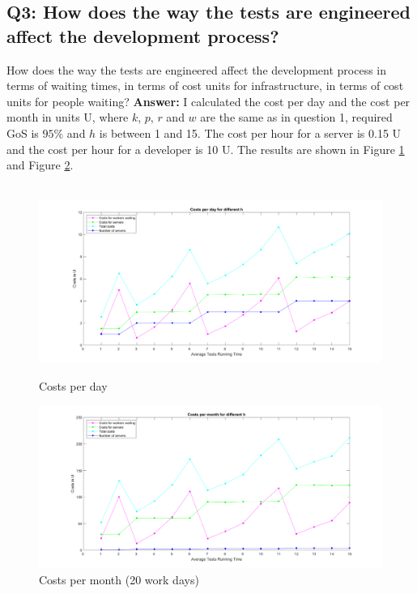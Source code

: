 \documentclass[a4paper]{article}
\begin{document}
\subsection{Q3: How does the way the tests are engineered affect the development process?}
How does the way the tests are engineered affect the development process in terms of waiting times, in terms of cost units for infrastructure, in terms of cost units for people waiting?
\newline \textbf{Answer:} I calculated the cost per day and the cost per month in units U, where $k$, $p$, $r$ and $w$ are the same as in question 1, required GoS is $ 95 \%$ and $h$ is between 1 and 15. The cost per hour for a server is 0.15 U and the cost per hour for a developer is 10 U. The results are shown in Figure \ref{costs_day} and Figure \ref{costs_month}.

\begin{figure}[h!]
\hbox{\hspace{-2cm} \includegraphics[scale=0.5]{plots/costs.png}}
\caption{Costs per day}
\label{costs_day}
\end{figure} 

\begin{figure}[h!]
\hbox{\hspace{-2cm}\includegraphics[scale=0.5]{plots/costs_month.png}}
\caption{Costs per month (20 work days)}
\label{costs_month}
\end{figure} 
\end{document}

